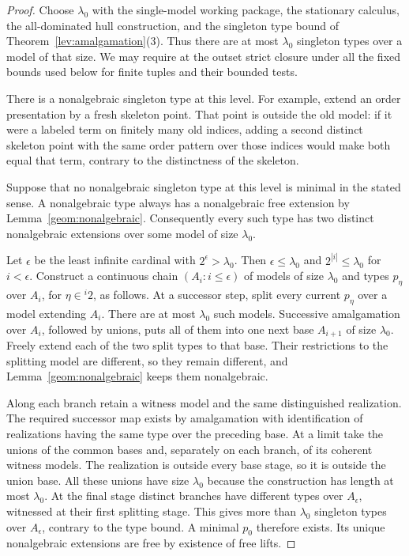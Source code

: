 \begin{proof}
Choose $\lambda_0$ with the single-model working package, the
stationary calculus, the all-dominated hull construction, and the
singleton type bound of Theorem~\ref{lev:amalgamation}(3).
Thus there are at most $\lambda_0$ singleton
types over a model of that size.  We may require at the outset strict
closure under all the fixed bounds used below for finite tuples and
their bounded tests.

There is a nonalgebraic singleton type at this level.  For example,
extend an order presentation by a fresh skeleton point.  That point is
outside the old model: if it were a labeled term on finitely many old
indices, adding a second distinct skeleton point with the same order
pattern over those indices would make both equal that term, contrary
to the distinctness of the skeleton.

Suppose that no nonalgebraic singleton type at this level is minimal in
the stated sense.  A nonalgebraic type always has a nonalgebraic free
extension by Lemma~\ref{geom:nonalgebraic}.  Consequently every such
type has two distinct nonalgebraic extensions over some model of size
$\lambda_0$.

Let $\epsilon$ be the least infinite cardinal with
$2^\epsilon>\lambda_0$.  Then $\epsilon\leq\lambda_0$ and
$2^{|i|}\leq\lambda_0$ for $i<\epsilon$.  Construct a continuous chain
$(A_i:i\leq\epsilon)$ of models of size $\lambda_0$ and types
$p_\eta$ over $A_i$, for $\eta\in{}^i2$, as follows.  At a successor
step, split every current $p_\eta$ over a model extending $A_i$.
There are at most $\lambda_0$ such models.  Successive amalgamation
over $A_i$, followed by unions, puts all of them into one next base
$A_{i+1}$ of size $\lambda_0$.  Freely extend each of the two split
types to that base.  Their restrictions to the splitting model are
different, so they remain different, and
Lemma~\ref{geom:nonalgebraic} keeps them nonalgebraic.

Along each branch retain a witness model and the same distinguished
realization.  The required successor map exists by amalgamation with
identification of realizations having the same type over the preceding
base.  At a limit take the unions of the common bases and, separately
on each branch, of its coherent witness models.  The realization is
outside every base stage, so it is outside the union base.  All these
unions have size $\lambda_0$ because the construction has length at
most $\lambda_0$.  At the final stage distinct branches have different
types over $A_\epsilon$, witnessed at their first splitting stage.
This gives more than $\lambda_0$ singleton types over $A_\epsilon$,
contrary to the type bound.  A minimal $p_0$ therefore exists.  Its
unique nonalgebraic extensions are free by existence of free lifts.
\end{proof}

